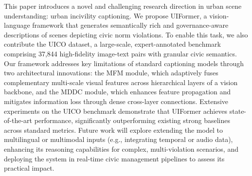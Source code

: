 \documentclass[lettersize,journal]{IEEEtran}
\begin{document}
	This paper introduces a novel and challenging research direction in urban scene understanding: urban incivility captioning. We propose UIFormer, a vision-language framework that generates semantically rich and governance-aware descriptions of scenes depicting civic norm violations. To enable this task, we also contribute the UICO dataset, a large-scale, expert-annotated benchmark comprising 37,844 high-fidelity image-text pairs with granular civic semantics. Our framework addresses key limitations of standard captioning models through two architectural innovations: the MFM module, which adaptively fuses complementary multi-scale visual features across hierarchical layers of a vision backbone, and the MDDC module, which enhances feature propagation and mitigates information loss through dense cross-layer connections. Extensive experiments on the UICO benchmark demonstrate that UIFormer achieves state-of-the-art performance, significantly outperforming existing strong baselines across standard metrics. Future work will explore extending the model to multilingual or multimodal inputs (e.g., integrating temporal or audio data), enhancing its reasoning capabilities for complex, multi-violation scenarios, and deploying the system in real-time civic management pipelines to assess its practical impact.
	
	
	   
	
\end{document}
